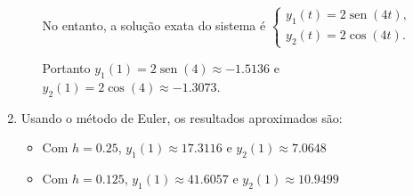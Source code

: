 \documentclass[12pt,a4paper]{article}
\newcommand*\sen{\operatorname{sen}}
\begin{document}
\begin{enumerate}
\begin{enumerate}
No entanto, a solução exata do sistema é
$\begin{cases}
y_1(t) = 2\sen(4t),\\
y_2(t) = 2\cos(4t).
\end{cases}$

Portanto $y_1(1) = 2\sen(4) \approx -1.5136$ e $y_2(1) = 2\cos(4) \approx -1.3073$.

\end{enumerate}
\item Usando o método de Euler, os resultados aproximados são:
\begin{itemize}
\item Com $h=0.25$, $y_1(1) \approx 17.3116$ e $y_2(1) \approx 7.0648$
\item Com $h=0.125$, $y_1(1) \approx 41.6057$ e $y_2(1) \approx 10.9499$
\end{itemize}
\end{enumerate}
\end{document}
